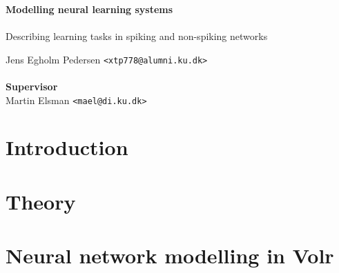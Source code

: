 \documentclass[a4paper,oneside]{memoir}
\begin{document}
    \thispagestyle{empty}
    \begin{adjustwidth}{-3cm}{-1.5cm}
    \vspace*{1cm}
    \textbf{\Huge Modelling neural learning systems} \\
    \\
    \vspace*{1cm}
    \hskip-2pt
    {\huge Describing learning tasks in spiking and non-spiking networks }\\
    \begin{tabbing}
    Jens Egholm Pedersen \hspace{1cm} \= \texttt{<xtp778@alumni.ku.dk>} \\
    \\[11cm]

    \textbf{\Large Supervisor} \\
    Martin Elsman \hspace{1cm} \texttt{<mael@di.ku.dk>}
    \end{tabbing}
    \end{adjustwidth}

    \newpage

    \ClearWallPaper

\renewcommand\cftchapteraftersnumb{\normalfont}
\renewcommand\cftbeforechapterskip{5pt plus 1pt}

\frontmatter
\setcounter{tocdepth}{2}
\tableofcontents*
\newpage

\mainmatter
\chapter{Introduction} \label{sec:intro}
  

\chapter{Theory}
  

\chapter{Neural network modelling in Volr} \label{sec:volr}
  
\end{document}
